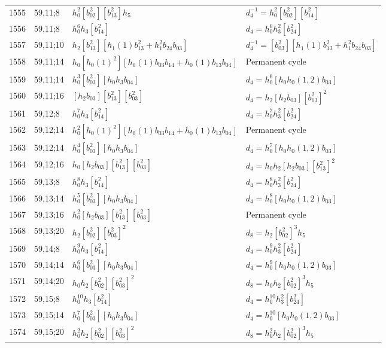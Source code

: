 \documentclass{article}
\begin{document}
\begin{longtable}{|l|l|>{\raggedright\arraybackslash}p{6cm}|>{\raggedright\arraybackslash}p{6cm}|}
\hline
1555 & 59,11;8 & $h_0^2[b_{02}^2][b_{13}^2]h_5$ & $d_{4}^{-1}=h_0^2[b_{02}^2][b_{14}^2]$\\
1556 & 59,11;8 & $h_0^6h_3[b_{14}^2]$ &$d_{4}=h_0^6h_3^2[b_{24}^2]$\\
\hline
1557 & 59,11;10 & $h_2[b_{13}^2][h_1(1)b_{13}^2 + h_1^2b_{24}b_{03}]$ & $d_{4}^{-1}=[b_{03}^2][h_1(1)b_{13}^2 + h_1^2b_{24}b_{03}]$\\
\hline
1558 & 59,11;14 & $h_0[h_0(1)^2][h_0(1)b_{03}b_{14} + h_0(1)b_{13}b_{04}]$ & Permanent cycle\\
1559 & 59,11;14 & $h_0^3[b_{03}^2][h_0h_3b_{04}]$ &$d_{4}=h_0^6[h_0h_0(1, 2)b_{03}]$\\
\hline
1560 & 59,11;16 & $[h_2b_{03}][b_{13}^2][b_{03}^2]$ &$d_{4}=h_2[h_2b_{03}][b_{13}^2]^2$\\
\hline
1561 & 59,12;8 & $h_0^7h_3[b_{14}^2]$ &$d_{4}=h_0^7h_3^2[b_{24}^2]$\\
\hline
1562 & 59,12;14 & $h_0^2[h_0(1)^2][h_0(1)b_{03}b_{14} + h_0(1)b_{13}b_{04}]$ & Permanent cycle\\
1563 & 59,12;14 & $h_0^4[b_{03}^2][h_0h_3b_{04}]$ &$d_{4}=h_0^7[h_0h_0(1, 2)b_{03}]$\\
\hline
1564 & 59,12;16 & $h_0[h_2b_{03}][b_{13}^2][b_{03}^2]$ &$d_{4}=h_0h_2[h_2b_{03}][b_{13}^2]^2$\\
\hline
1565 & 59,13;8 & $h_0^8h_3[b_{14}^2]$ &$d_{4}=h_0^8h_3^2[b_{24}^2]$\\
\hline
1566 & 59,13;14 & $h_0^5[b_{03}^2][h_0h_3b_{04}]$ &$d_{4}=h_0^8[h_0h_0(1, 2)b_{03}]$\\
\hline
1567 & 59,13;16 & $h_0^2[h_2b_{03}][b_{13}^2][b_{03}^2]$ & Permanent cycle\\
\hline
1568 & 59,13;20 & $h_2[b_{02}^2][b_{03}^2]^2$ &$d_{8}=h_2[b_{02}^2]^3h_5$\\
\hline
1569 & 59,14;8 & $h_0^9h_3[b_{14}^2]$ &$d_{4}=h_0^9h_3^2[b_{24}^2]$\\
\hline
1570 & 59,14;14 & $h_0^6[b_{03}^2][h_0h_3b_{04}]$ &$d_{4}=h_0^9[h_0h_0(1, 2)b_{03}]$\\
\hline
1571 & 59,14;20 & $h_0h_2[b_{02}^2][b_{03}^2]^2$ &$d_{8}=h_0h_2[b_{02}^2]^3h_5$\\
\hline
1572 & 59,15;8 & $h_0^{10}h_3[b_{14}^2]$ &$d_{4}=h_0^{10}h_3^2[b_{24}^2]$\\
\hline
1573 & 59,15;14 & $h_0^7[b_{03}^2][h_0h_3b_{04}]$ &$d_{4}=h_0^{10}[h_0h_0(1, 2)b_{03}]$\\
\hline
1574 & 59,15;20 & $h_0^2h_2[b_{02}^2][b_{03}^2]^2$ &$d_{8}=h_0^2h_2[b_{02}^2]^3h_5$\\

\end{longtable}
\end{document}

